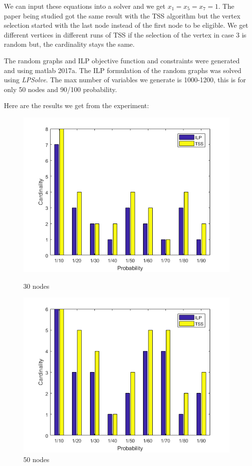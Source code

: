 We can input these equations into a solver and we get $x_{1}=x_{5}=x_{7}=1$. The paper being studied got the same result with the TSS algorithm but the vertex selection started with the last node instead of the first node to be eligible. We get different vertices in different runs of TSS if the selection of the vertex in case 3 is random but, the cardinality stays the same.

The random graphs and ILP objective function and constraints were generated and using matlab 2017a. The ILP formulation of the random graphs was solved using \textit{LPSolve}\cite{lpsolve}. The max number of variables we generate is 1000-1200, this is for only 50 nodes and 90/100 probability.

Here are the results we get from the experiment:

\begin{figure}[h!]
\begin{minipage}[t]{0.50\textwidth}
\includegraphics[width=\linewidth,keepaspectratio=true]{images/rand30result.png}
\caption{30 nodes}

\end{minipage}
\begin{minipage}[t]{0.50\textwidth}
\includegraphics[width=\linewidth,keepaspectratio=true]{images/rand50result.png}
\caption{50 nodes}
\end{minipage}
\end{figure}

